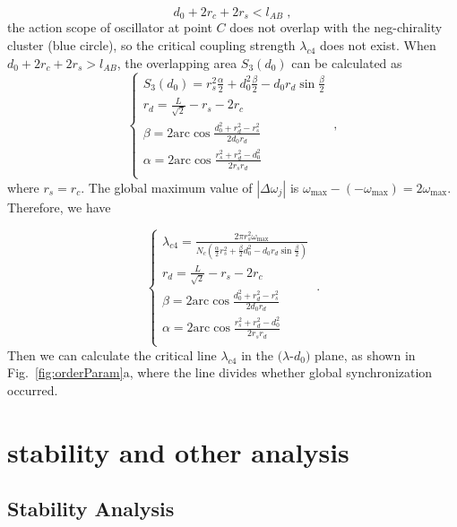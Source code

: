 \documentclass[%
 aip,
 amsmath,amssymb,
 reprint,%
]{revtex4-1}
\begin{document}
\begin{equation}
    d_0+2r_c+2r_s<l_{AB}\;,
\end{equation}
the action scope of oscillator at point $C$ does not overlap with the neg-chirality cluster (blue circle), so the critical coupling strength $\lambda_{c4}$ does not exist. When $d_0+2r_c+2r_s>l_{AB}$, the overlapping area $S_3\left( d_0 \right)$ can be calculated as
\begin{equation}
    \begin{cases}
        S_3\left( d_0 \right) =r_{s}^{2}\frac{\alpha}{2}+d_{0}^{2}\frac{\beta}{2}-d_0r_d\sin \frac{\beta}{2}\\
        r_d=\frac{L}{\sqrt{2}}-r_s-2r_c\\
        \beta =2\mathrm{arc}\cos \frac{d_{0}^{2}+r_{d}^{2}-r_{s}^{2}}{2d_0r_d}\\
        \alpha =2\mathrm{arc}\cos \frac{r_{s}^{2}+r_{d}^{2}-d_{0}^{2}}{2r_sr_d}\\
    \end{cases}\;,
\end{equation}
where $r_s=r_c$. The global maximum value of $\left| \Delta \omega _j \right|$ is $\omega _{\max}-\left( -\omega _{\max} \right) =2\omega _{\max}$. Therefore, we have

\begin{equation}
    \begin{cases}
        \lambda _{c4}=\frac{2\pi r_{s}^{2}\omega _{\max}}{N_c\left( \frac{\alpha}{2}r_{s}^{2}+\frac{\beta}{2}d_{0}^{2}-d_0r_d\sin \frac{\beta}{2} \right)}\\
        r_d=\frac{L}{\sqrt{2}}-r_s-2r_c\\
        \beta =2\mathrm{arc}\cos \frac{d_{0}^{2}+r_{d}^{2}-r_{s}^{2}}{2d_0r_d}\\
        \alpha =2\mathrm{arc}\cos \frac{r_{s}^{2}+r_{d}^{2}-d_{0}^{2}}{2r_sr_d}\\
    \end{cases}\;.
\end{equation}
Then we can calculate the critical line $\lambda_{c4}$ in the $(\lambda$-$d_0)$ plane, as shown in Fig.~\ref{fig:orderParam}a, where the line divides whether global synchronization occurred.

\section{stability and other analysis}

\subsection{Stability Analysis}
\end{document}
